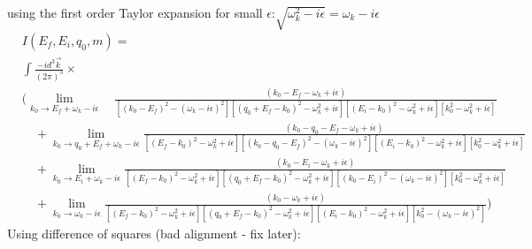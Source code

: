 using the first order Taylor expansion for small $\epsilon$:$\sqrt{\omega_k^2 - i \epsilon} = \omega_k - i \epsilon$
\begin{align*}
&I(E_f, E_i, q_0, m) = \\
&\int \frac{-i d^3 \vec{k}}{(2\pi)^3} \times\\
&\bigg(\lim_{k_0 \to E_f + \omega_k - i \epsilon}\quad\frac{(k_0 - E_f - \omega_k + i \epsilon)}{
\left[(k_0 -E_f)^2 - (\omega_k - i \epsilon)^2\right] %
\left[(q_0 + E_f - k_0)^2 - \omega_k^2 + i\epsilon\right]
\left[(E_i - k_0)^2 - \omega_k^2 + i\epsilon\right]
\left[k_0^2 - \omega_k^2 + i\epsilon\right]
} \\
&\quad + \lim_{k_0 \to q_0 + E_f + \omega_k - i \epsilon}\frac{(k_0 - q_0 - E_f - \omega_k + i \epsilon)}{
\left[(E_f - k_0)^2 - \omega_k^2 + i\epsilon\right]
\left[(k_0 -q_0 - E_f)^2 - (\omega_k - i \epsilon)^2\right]%
\left[(E_i - k_0)^2 - \omega_k^2 + i\epsilon\right]
\left[k_0^2 - \omega_k^2 + i\epsilon\right]
} \\
&\quad + \lim_{k_0 \to E_i + \omega_k - i \epsilon}\frac{(k_0 - E_i - \omega_k + i \epsilon)}{
\left[(E_f - k_0)^2 - \omega_k^2 + i\epsilon\right]
\left[(q_0 + E_f - k_0)^2 - \omega_k^2 + i\epsilon\right]
\left[(k_0 - E_i)^2 - (\omega_k - i \epsilon)^2\right]%
\left[k_0^2 - \omega_k^2 + i\epsilon\right]
} \\
&\quad + \lim_{k_0 \to \omega_k - i \epsilon}\frac{(k_0 - \omega_k + i \epsilon)}{
\left[(E_f - k_0)^2 - \omega_k^2 + i\epsilon\right]
\left[(q_0 + E_f - k_0)^2 - \omega_k^2 + i\epsilon\right]
\left[(E_i - k_0)^2 - \omega_k^2 + i\epsilon\right]
\left[k_0^2 - (\omega_k - i \epsilon)^2\right]%
} \bigg)
\end{align*}
Using difference of squares (bad alignment - fix later):
